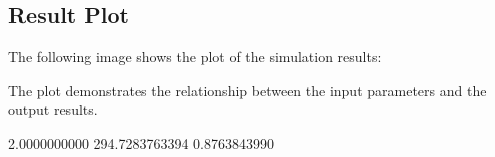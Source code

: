 \subsection*{Result Plot}

The following image shows the plot of the simulation results\-:



The plot demonstrates the relationship between the input parameters and the output results.


\begin{DoxyCodeInclude}
2.0000000000    294.7283763394  0.8763843990    
\end{DoxyCodeInclude}
 
